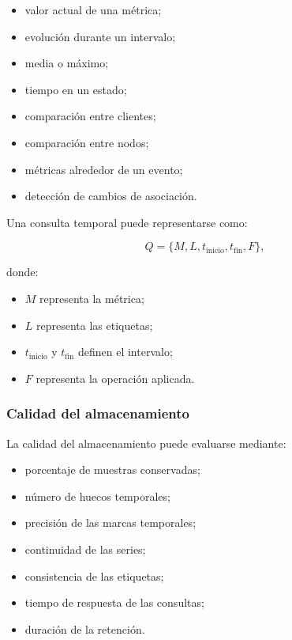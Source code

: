 \begin{itemize}
    \item valor actual de una métrica;

    \item evolución durante un intervalo;

    \item media o máximo;

    \item tiempo en un estado;

    \item comparación entre clientes;

    \item comparación entre nodos;

    \item métricas alrededor de un evento;

    \item detección de cambios de asociación.
\end{itemize}

Una consulta temporal puede representarse como:

\[
    Q
    =
    \{
        M,
        L,
        t_{\mathrm{inicio}},
        t_{\mathrm{fin}},
        F
    \},
\]

donde:

\begin{itemize}
    \item \(M\) representa la métrica;

    \item \(L\) representa las etiquetas;

    \item \(t_{\mathrm{inicio}}\) y \(t_{\mathrm{fin}}\) definen el
    intervalo;

    \item \(F\) representa la operación aplicada.
\end{itemize}


\subsubsection*{Calidad del almacenamiento}

La calidad del almacenamiento puede evaluarse mediante:

\begin{itemize}
    \item porcentaje de muestras conservadas;

    \item número de huecos temporales;

    \item precisión de las marcas temporales;

    \item continuidad de las series;

    \item consistencia de las etiquetas;

    \item tiempo de respuesta de las consultas;

    \item duración de la retención.
\end{itemize}

